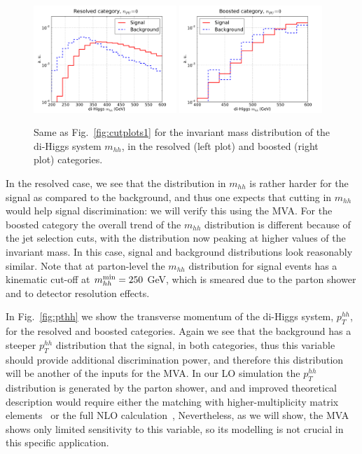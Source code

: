 \begin{figure}[t]
\begin{center}
  \includegraphics[width=0.48\textwidth]{plots/m_HH_C2_res_noPU.pdf}
  \includegraphics[width=0.48\textwidth]{plots/m_HH_C2_bst_noPU.pdf}
  \caption{\small
Same as   Fig.~\ref{fig:cutplots1} for the invariant
mass distribution of the di-Higgs system $m_{hh}$, in
the resolved (left plot) and boosted (right plot) categories.
}
\label{fig:mhh}
\end{center}
\end{figure}

In the resolved case, we see that the distribution
in $m_{hh}$ is rather harder for the signal as compared
to the background,
and thus one expects that cutting in $m_{hh}$ would help signal
discrimination: we will verify this using the MVA.
%
For the boosted category the overall trend of the $m_{hh}$ distribution
is different because of the jet selection cuts, with the
distribution now peaking at higher values of the invariant mass.
%
In this case, signal and background distributions
look reasonably similar.
%
Note that at parton-level the $m_{hh}$ distribution
for signal events has a kinematic
cut-off at $m_{hh}^{\rm min}=250$ GeV, which is smeared due
to 
the parton shower and to detector resolution effects.
%


In Fig.~\ref{fig:pthh} we show the transverse momentum of
the di-Higgs system, $p_T^{hh}$,
for the resolved and boosted categories.
%
Again we see that the background has a steeper $p_T^{hh}$ distribution
that the signal, in both categories, thus this variable
should provide additional discrimination power, and therefore
this distribution will be another of the inputs for the MVA.
%
In our LO simulation the $p_T^{hh}$ distribution is generated
by the parton shower, and and improved theoretical
description would require
either the matching with higher-multiplicity
matrix elements~\cite{Maierhofer:2013sha} or
the full NLO calculation~\cite{Frederix:2014hta},
%
Nevertheless, as we will show,
the MVA shows only limited sensitivity to this variable, so its
modelling is not crucial in this specific application.

